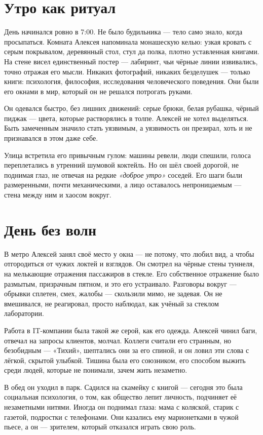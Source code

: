 \documentclass[12pt,a4paper]{book}
\begin{document}
\section{Утро как ритуал}

День начинался ровно в 7:00. Не было будильника --- тело само знало, когда просыпаться. Комната Алексея напоминала монашескую келью: узкая кровать с серым покрывалом, деревянный стол, стул да полка, плотно уставленная книгами. На стене висел единственный постер --- лабиринт, чьи чёрные линии извивались, точно отражая его мысли. Никаких фотографий, никаких безделушек --- только книги: психология, философия, исследования человеческого поведения. Они были его окнами в мир, который он не решался потрогать руками.

Он одевался быстро, без лишних движений: серые брюки, белая рубашка, чёрный пиджак --- цвета, которые растворялись в толпе. Алексей не хотел выделяться. Быть замеченным значило стать уязвимым, а уязвимость он презирал, хоть и не признавался в этом даже себе.

Улица встретила его привычным гулом: машины ревели, люди спешили, голоса переплетались в утренний шумовой коктейль. Но он шёл своей дорогой, не поднимая глаз, не отвечая на редкие \textit{«доброе утро»} соседей. Его шаги были размеренными, почти механическими, а лицо оставалось непроницаемым --- стена между ним и хаосом вокруг.

\section{День без волн}

В метро Алексей занял своё место у окна --- не потому, что любил вид, а чтобы отгородиться от чужих локтей и взглядов. Он смотрел на чёрные стены туннеля, на мелькающие отражения пассажиров в стекле. Его собственное отражение было размытым, призрачным пятном, и это его устраивало. Разговоры вокруг --- обрывки сплетен, смех, жалобы --- скользили мимо, не задевая. Он не вмешивался, не реагировал, просто наблюдал, как учёный за стеклом лаборатории.

Работа в IT-компании была такой же серой, как его одежда. Алексей чинил баги, отвечал на запросы клиентов, молчал. Коллеги считали его странным, но безобидным --- «Тихий», шептались они за его спиной, и он ловил эти слова с лёгкой, скрытой улыбкой. Тишина была его союзником, его способом выжить среди людей, которые не понимали, зачем жить незаметно.

В обед он уходил в парк. Садился на скамейку с книгой --- сегодня это была социальная психология, о том, как общество лепит личность, подчиняет её незаметными нитями. Иногда он поднимал глаза: мама с коляской, старик с газетой, подростки с телефонами. Они казались ему марионетками в чужой пьесе, а он --- зрителем, который отказался играть свою роль.
\end{document}
